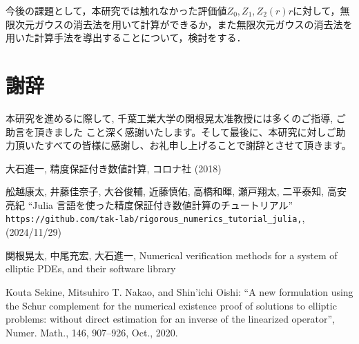 \documentclass[11pt,a4paper,titlepage]{jsreport}
\theoremstyle{definition}
\begin{document}
今後の課題として，本研究では触れなかった評価値$Z_0, Z_1, Z_2(r)r$に対して，無限次元ガウスの消去法を用いて計算ができるか，また無限次元ガウスの消去法を用いた計算手法を導出することについて，検討をする．

\chapter*{謝辞}
本研究を進めるに際して, 千葉工業大学の関根晃太准教授には多くのご指導, ご助言を頂きました
こと深く感謝いたします。そして最後に、本研究に対しご助力頂いたすべての皆様に感謝し、お礼申し上げることで謝辞とさせて頂きます。
 \newpage 

\nocite{*}
%
%

\begin{thebibliography}{99}
   大石進一, 精度保証付き数値計算, コロナ社 (2018)

  舩越康太, 井藤佳奈子, 大谷俊輔, 近藤慎佑, 高橋和暉, 瀬戸翔太, 二平泰知, 高安亮紀
  \newblock ``Julia 言語を使った精度保証付き数値計算のチュートリアル''
  \newblock \verb|https://github.com/tak-lab/rigorous_numerics_tutorial_julia,|,(2024/11/29)

  関根晃太, 中尾充宏, 大石進一, Numerical verification methods for a system of elliptic PDEs,
  and their software library

    Kouta Sekine, Mitsuhiro T. Nakao, and Shin'ichi Oishi: “A new formulation using the Schur complement for the numerical existence proof of solutions to elliptic problems: without direct estimation for an inverse of the linearized operator”, Numer. Math., 146, 907–926, Oct., 2020.

\end{thebibliography}
\end{document}
